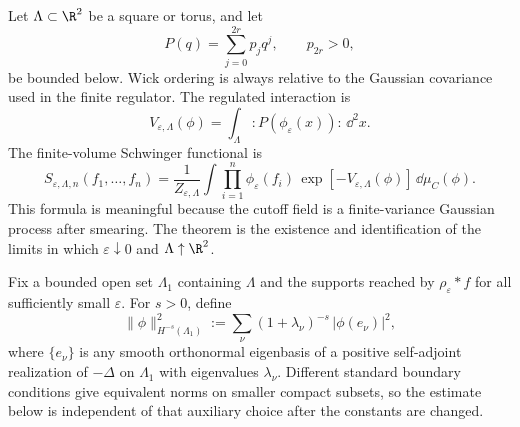 Let \(\Lambda\subset\R^2\) be a square or torus, and let
\[
  P(q)=\sum_{j=0}^{2r} p_j q^j,
  \qquad p_{2r}>0,
\]
be bounded below.  Wick ordering is always relative to the Gaussian
covariance used in the finite regulator.  The regulated interaction is
\begin{equation}
  V_{\varepsilon,\Lambda}(\phi)
  =
  \int_\Lambda :\!P(\phi_\varepsilon(x))\!:\,\dd^2x .
  \label{eq:p-phi-two-regulated-interaction}
\end{equation}
The finite-volume Schwinger functional is
\begin{equation}
  S_{\varepsilon,\Lambda,n}(f_1,\ldots,f_n)
  =
  \frac{1}{Z_{\varepsilon,\Lambda}}
  \int
  \prod_{i=1}^n\phi_\varepsilon(f_i)\,
  \exp[-V_{\varepsilon,\Lambda}(\phi)]\,\dd\mu_C(\phi).
  \label{eq:p-phi-two-schwinger-regulated}
\end{equation}
This formula is meaningful because the cutoff field is a finite-variance
Gaussian process after smearing.  The theorem is the existence and
identification of the limits in which \(\varepsilon\downarrow0\) and
\(\Lambda\uparrow\R^2\).

\begin{definition}
\label{def:p-phi-two-negative-sobolev-norm}
Fix a bounded open set \(\Lambda_1\) containing \(\Lambda\) and the supports
reached by \(\rho_\varepsilon\ast f\) for all sufficiently small
\(\varepsilon\).  For \(s>0\), define
\begin{equation}
  \|\phi\|_{H^{-s}(\Lambda_1)}^2
  :=
  \sum_{\nu}
  (1+\lambda_\nu)^{-s}\,|\phi(e_\nu)|^2,
  \label{eq:p-phi-two-negative-sobolev-norm}
\end{equation}
where \(\{e_\nu\}\) is any smooth orthonormal eigenbasis of a positive
self-adjoint realization of \(-\Delta\) on \(\Lambda_1\) with eigenvalues
\(\lambda_\nu\).  Different standard boundary conditions give equivalent
norms on smaller compact subsets, so the estimate below is independent of
that auxiliary choice after the constants are changed.
\end{definition}

